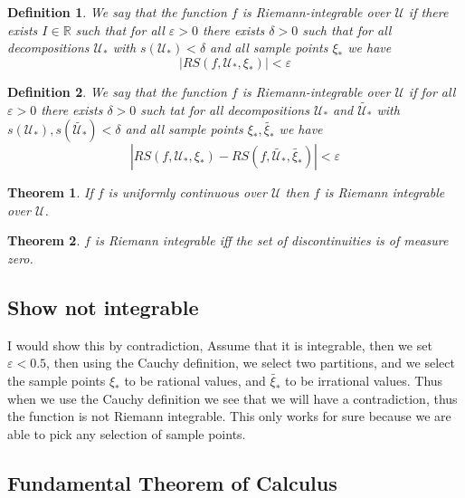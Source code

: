 \documentclass[12pt]{armath}
\newtheorem{theorem}{Theorem}[section]
\newtheorem{definition}{Definition}[section]
\newcommand{\U}{\mathcal{U}}
\newcommand{\R}{\mathbb{R}}
\newcommand{\abs}[1]{\left\vert{#1}\right\vert}
\newcommand{\e}{\varepsilon}
\newcommand{\de}{\delta}
\begin{document}
  \begin{definition}
    We say that the function $f$ is Riemann-integrable over $\U$ if there exists
    $I\in\R$ such that for all $\e>0$ there exists $\de>0$ such that for all
    decompositions $\U_*$ with $s(\U_*)<\de$ and all sample points $\xi_*$ we
    have
    \[
      \abs{RS(f,\U_*,\xi_*)}<\e
    \]
  \end{definition}

  \begin{definition}
    We say that the function $f$ is Riemann-integrable over $\U$ if for all
    $\e>0$ there exists $\de>0$ such tat for all decompositions $\U_*$ and
    $\widetilde{\U_*}$ with $s(\U_*),s(\widetilde{\U_*})<\de$ and all sample
    points $\xi_*,\widetilde{\xi_*}$ we have
    \[
      \abs{RS(f,\U_*,\xi_*)-RS(f,\widetilde{\U_*},\widetilde{\xi_*})} < \e
    \]
  \end{definition}

  \begin{theorem}
    If $f$ is uniformly continuous over $\U$ then $f$ is Riemann integrable over
    $\U$.
  \end{theorem}

  \begin{theorem}
    $f$ is Riemann integrable iff the set of discontinuities is of measure zero.
  \end{theorem}

  \subsection{Show not integrable}%
  \label{sub:show_not_integrable}

  I would show this by contradiction, Assume that it is integrable, then we set
  $\e<0.5$, then using the Cauchy definition, we select two partitions, and we
  select the sample points $\xi_*$ to be rational values, and $\widetilde{\xi_*}$
  to be irrational values. Thus when we use the Cauchy definition we see that we
  will have a contradiction, thus the function is not Riemann integrable. This
  only works for sure because we are able to pick any selection of sample points.

  \subsection{Fundamental Theorem of Calculus}%
  \label{sub:fundamental_theorem_of_calculus}
\end{document}
